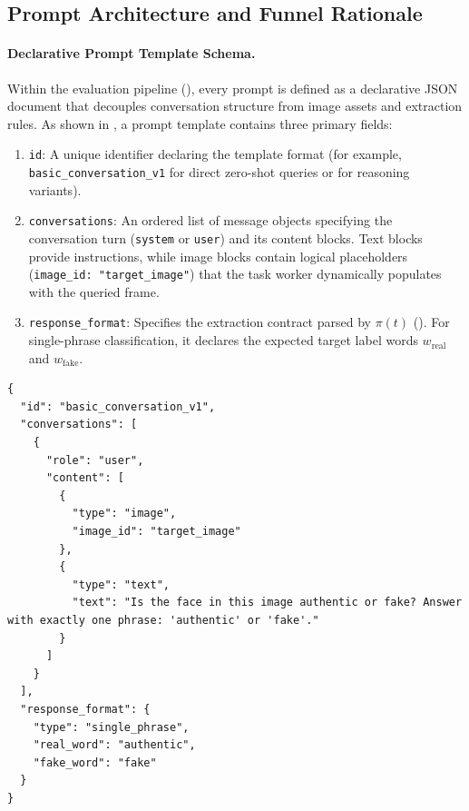 \subsection{Prompt Architecture and Funnel Rationale}
\label{subsec:prompt_funnel_rationale}

\paragraph{Declarative Prompt Template Schema.}
Within the evaluation pipeline (), every prompt is defined as a declarative JSON document that decouples conversation structure from image assets and extraction rules. As shown in , a prompt template contains three primary fields:
\begin{enumerate}
    \item \texttt{id}: A unique identifier declaring the template format (for example, \texttt{basic\_conversation\_v1} for direct zero-shot queries or \texttt{} for reasoning variants).
    \item \texttt{conversations}: An ordered list of message objects specifying the conversation turn (\texttt{system} or \texttt{user}) and its content blocks. Text blocks provide instructions, while image blocks contain logical placeholders (\texttt{image\_id: "target\_image"}) that the task worker dynamically populates with the queried frame.
    \item \texttt{response\_format}: Specifies the extraction contract parsed by $\pi(t)$ (). For single-phrase classification, it declares the expected target label words $w_{\text{real}}$ and $w_{\text{fake}}$.
\end{enumerate}

\begin{lstlisting}[basicstyle=\ttfamily\scriptsize,breaklines=true,frame=single,caption={Declarative JSON template schema for a minimal zero-shot prompt.},label={lst:prompt_schema}]
{
  "id": "basic_conversation_v1",
  "conversations": [
    {
      "role": "user",
      "content": [
        {
          "type": "image",
          "image_id": "target_image"
        },
        {
          "type": "text",
          "text": "Is the face in this image authentic or fake? Answer with exactly one phrase: 'authentic' or 'fake'."
        }
      ]
    }
  ],
  "response_format": {
    "type": "single_phrase",
    "real_word": "authentic",
    "fake_word": "fake"
  }
}
\end{lstlisting}

